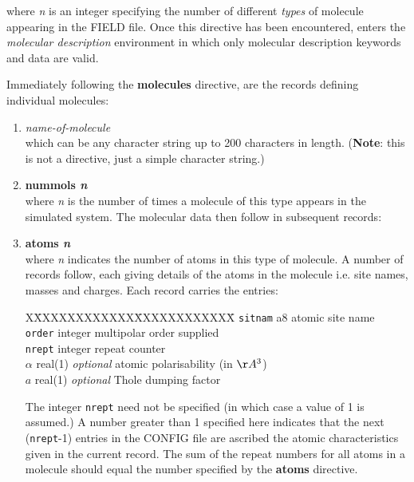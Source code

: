 
\noindent where {\em n} is an integer specifying the number of
different {\em types} of molecule appearing in the FIELD file.
Once this directive has been encountered, \D enters the {\em
molecular description} environment in which only molecular
description keywords and data are valid.

Immediately following the {\bf molecules} directive, are the records
defining individual molecules:

\begin{enumerate}

\item {\em name-of-molecule} \\
which can be any character string up to 200 characters in length.
({\bf Note}: this is not a directive, just a simple character string.)

\item {\bf nummols {\em n}} \\
where {\em n} is the number of times a molecule of this type
appears in the simulated system.  The molecular data then follow
in subsequent records:

\item {\bf atoms {\em n}} \\
where {\em n} indicates the number of atoms in this type of
molecule.  A number of records follow, each giving details of the
atoms in the molecule i.e. site names, masses and charges.  Each
record carries the entries:
\begin{tabbing}
X\=XXXXXXXXXXXX\=XXXXXXXXXXXX\=\kill
\> {\tt sitnam}    \> a8      \> atomic site name \\
\> {\tt order}     \> integer \> multipolar order supplied \\
\> {\tt nrept}     \> integer \> repeat counter \\
\> {\tt $\alpha$}  \> real(1) \> {\em optional} atomic polarisability (in $\AA^{3}$) \\
\> {\tt $a$}       \> real(1) \> {\em optional} Thole dumping factor
\end{tabbing}
The integer {\tt nrept} need not be specified (in which case a value
of 1 is assumed.)  A number greater than 1 specified here indicates
that the next ({\tt nrept}-1) entries in the CONFIG file are ascribed
the atomic characteristics given in the current record.  The sum of the
repeat numbers for all atoms in a molecule should equal the number
specified by the {\bf atoms} directive.


\end{enumerate}
